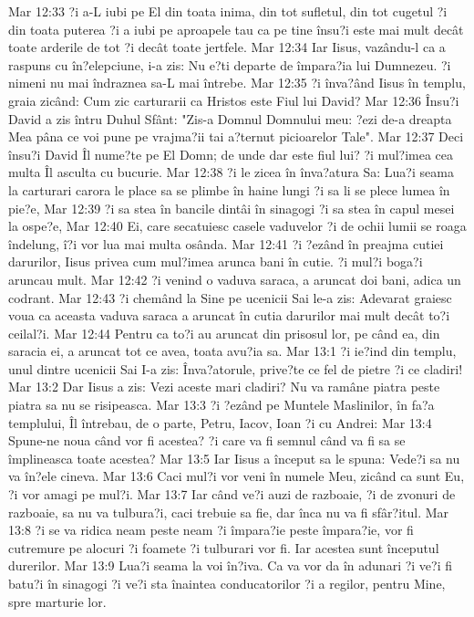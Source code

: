 Mar 12:33  ?i a-L iubi pe El din toata inima, din tot sufletul, din tot cugetul ?i din toata puterea ?i a iubi pe aproapele tau ca pe tine însu?i este mai mult decât toate arderile de tot ?i decât toate jertfele.
Mar 12:34  Iar Iisus, vazându-l ca a raspuns cu în?elepciune, i-a zis: Nu e?ti departe de împara?ia lui Dumnezeu. ?i nimeni nu mai îndraznea sa-L mai întrebe.
Mar 12:35  ?i înva?ând Iisus în templu, graia zicând: Cum zic carturarii ca Hristos este Fiul lui David?
Mar 12:36  Însu?i David a zis întru Duhul Sfânt: "Zis-a Domnul Domnului meu: ?ezi de-a dreapta Mea pâna ce voi pune pe vrajma?ii tai a?ternut picioarelor Tale".
Mar 12:37  Deci însu?i David Îl nume?te pe El Domn; de unde dar este fiul lui? ?i mul?imea cea multa Îl asculta cu bucurie.
Mar 12:38  ?i le zicea în înva?atura Sa: Lua?i seama la carturari carora le place sa se plimbe în haine lungi ?i sa li se plece lumea în pie?e,
Mar 12:39  ?i sa stea în bancile dintâi în sinagogi ?i sa stea în capul mesei la ospe?e,
Mar 12:40  Ei, care secatuiesc casele vaduvelor ?i de ochii lumii se roaga îndelung, î?i vor lua mai multa osânda.
Mar 12:41  ?i ?ezând în preajma cutiei darurilor, Iisus privea cum mul?imea arunca bani în cutie. ?i mul?i boga?i aruncau mult.
Mar 12:42  ?i venind o vaduva saraca, a aruncat doi bani, adica un codrant.
Mar 12:43  ?i chemând la Sine pe ucenicii Sai le-a zis: Adevarat graiesc voua ca aceasta vaduva saraca a aruncat în cutia darurilor mai mult decât to?i ceilal?i.
Mar 12:44  Pentru ca to?i au aruncat din prisosul lor, pe când ea, din saracia ei, a aruncat tot ce avea, toata avu?ia sa.
Mar 13:1  ?i ie?ind din templu, unul dintre ucenicii Sai I-a zis: Înva?atorule, prive?te ce fel de pietre ?i ce cladiri!
Mar 13:2  Dar Iisus a zis: Vezi aceste mari cladiri? Nu va ramâne piatra peste piatra sa nu se risipeasca.
Mar 13:3  ?i ?ezând pe Muntele Maslinilor, în fa?a templului, Îl întrebau, de o parte, Petru, Iacov, Ioan ?i cu Andrei:
Mar 13:4  Spune-ne noua când vor fi acestea? ?i care va fi semnul când va fi sa se împlineasca toate acestea?
Mar 13:5  Iar Iisus a început sa le spuna: Vede?i sa nu va în?ele cineva.
Mar 13:6  Caci mul?i vor veni în numele Meu, zicând ca sunt Eu, ?i vor amagi pe mul?i.
Mar 13:7  Iar când ve?i auzi de razboaie, ?i de zvonuri de razboaie, sa nu va tulbura?i, caci trebuie sa fie, dar înca nu va fi sfâr?itul.
Mar 13:8  ?i se va ridica neam peste neam ?i împara?ie peste împara?ie, vor fi cutremure pe alocuri ?i foamete ?i tulburari vor fi. Iar acestea sunt începutul durerilor.
Mar 13:9  Lua?i seama la voi în?iva. Ca va vor da în adunari ?i ve?i fi batu?i în sinagogi ?i ve?i sta înaintea conducatorilor ?i a regilor, pentru Mine, spre marturie lor.
